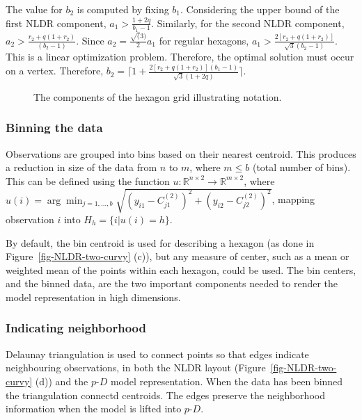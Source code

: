 \documentclass[
  12pt]{article}
\newcommand\pD{$p\text{-}D$}
\begin{document}
The value for \(b_2\) is computed by fixing \(b_1\). Considering the
upper bound of the first NLDR component, \(a_1 > \frac{1+2q}{b_1 -1}\).
Similarly, for the second NLDR component,
\(a_2 > \frac{r_2 + q(1 + r_2)}{(b_2 - 1)}\). Since
\(a_2 = \frac{\sqrt(3)}{2}a_1\) for regular hexagons,
\(a_1 > \frac{2[r_2 + q(1 + r_2)]}{\sqrt{3}(b_2 - 1)}\). This is a
linear optimization problem. Therefore, the optimal solution must occur
on a vertex. Therefore,
\(b_2 = \Big\lceil1 +\frac{2[r_2 + q(1 + r_2)](b_1 - 1)}{\sqrt{3}(1 + 2q)}\Big\rceil\).

\begin{figure}[H]


\caption{\label{fig-hex-param}The components of the hexagon grid
illustrating notation.}

\end{figure}%

\subsubsection{Binning the data}\label{binning-the-data}

Observations are grouped into bins based on their nearest centroid. This
produces a reduction in size of the data from \(n\) to \(m\), where
\(m\leq b\) (total number of bins). This can be defined using the
function
\(u: \mathbb{R}^{n\times 2} \rightarrow \mathbb{R}^{m\times 2}\), where
\(u(i) = \arg\min_{j = 1, \dots, b} \sqrt{(y_{i1} - C^{(2)}_{j1})^2 + (y_{i2} - C^{(2)}_{j2})^2}\),
mapping observation \(i\) into \(H_h = \{i| u(i) = h\}\).

By default, the bin centroid is used for describing a hexagon (as done
in Figure~\ref{fig-NLDR-two-curvy} (c)), but any measure of center, such
as a mean or weighted mean of the points within each hexagon, could be
used. The bin centers, and the binned data, are the two important
components needed to render the model representation in high dimensions.

\subsubsection{Indicating neighborhood}\label{indicating-neighborhood}

Delaunay triangulation \citep{lee1980, alb2024} is used to connect
points so that edges indicate neighbouring observations, in both the
NLDR layout (Figure~\ref{fig-NLDR-two-curvy} (d)) and the \pD{} model
representation. When the data has been binned the triangulation connectd
centroids. The edges preserve the neighborhood information when the
model is lifted into \pD{}.
\end{document}
